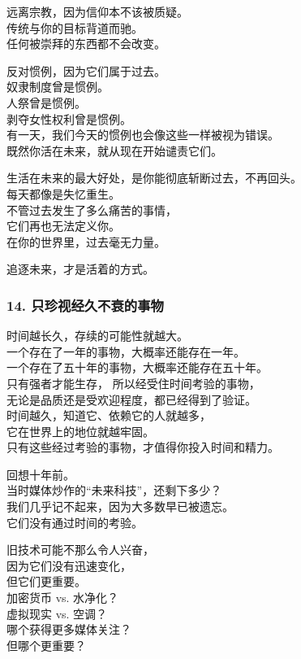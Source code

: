 \documentclass[
]{article}
\begin{document}
远离宗教，因为信仰本不该被质疑。\\
传统与你的目标背道而驰。\\
任何被崇拜的东西都不会改变。

反对惯例，因为它们属于过去。\\
奴隶制度曾是惯例。\\
人祭曾是惯例。\\
剥夺女性权利曾是惯例。\\
有一天，我们今天的惯例也会像这些一样被视为错误。\\
既然你活在未来，就从现在开始谴责它们。

生活在未来的最大好处，是你能彻底斩断过去，不再回头。\\
每天都像是失忆重生。\\
不管过去发生了多么痛苦的事情，\\
它们再也无法定义你。\\
在你的世界里，过去毫无力量。

追逐未来，才是活着的方式。

\subsubsection{\texorpdfstring{14. 只珍视经久不衰的事物
}{14. 只珍视经久不衰的事物 }}\label{14-ux53eaux73cdux89c6ux7ecfux4e45ux4e0dux8870ux7684ux4e8bux7269}

时间越长久，存续的可能性就越大。\\
一个存在了一年的事物，大概率还能存在一年。\\
一个存在了五十年的事物，大概率还能存在五十年。\\
只有强者才能生存， 所以经受住时间考验的事物，\\
无论是品质还是受欢迎程度，都已经得到了验证。\\
时间越久，知道它、依赖它的人就越多，\\
它在世界上的地位就越牢固。\\
只有这些经过考验的事物，才值得你投入时间和精力。

回想十年前。\\
当时媒体炒作的``未来科技''，还剩下多少？\\
我们几乎记不起来，因为大多数早已被遗忘。\\
它们没有通过时间的考验。

旧技术可能不那么令人兴奋，\\
因为它们没有迅速变化，\\
但它们更重要。\\
加密货币 vs. 水净化？\\
虚拟现实 vs. 空调？\\
哪个获得更多媒体关注？\\
但哪个更重要？
\end{document}
